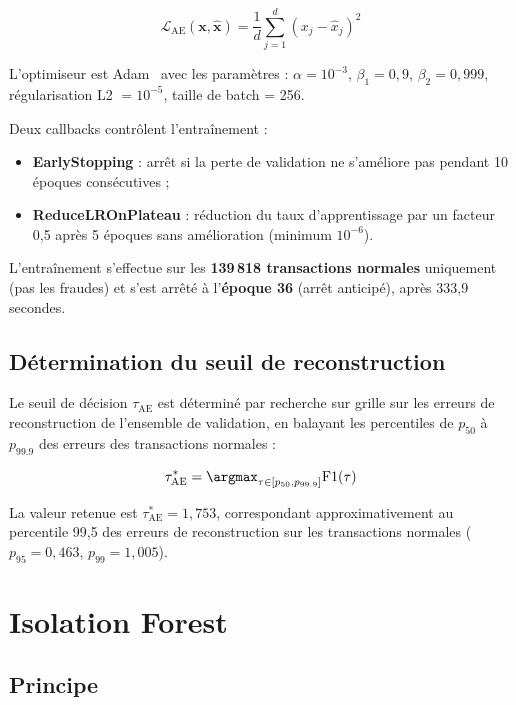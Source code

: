 \documentclass[12pt,a4paper,twoside]{report}
\theoremstyle{definition}
\begin{document}
\begin{equation}
\mathcal{L}_{\text{AE}}(\mathbf{x}, \hat{\mathbf{x}}) =
\frac{1}{d} \sum_{j=1}^{d} (x_j - \hat{x}_j)^2
\label{eq:ae_loss}
\end{equation}

L'optimiseur est Adam~\cite{kingma2014adam} avec les paramètres :
$\alpha = 10^{-3}$, $\beta_1 = 0{,}9$, $\beta_2 = 0{,}999$,
régularisation L2 $= 10^{-5}$, taille de batch = 256.

Deux callbacks contrôlent l'entraînement :
\begin{itemize}
  \item \textbf{EarlyStopping} : arrêt si la perte de validation ne s'améliore
    pas pendant 10 époques consécutives ;
  \item \textbf{ReduceLROnPlateau} : réduction du taux d'apprentissage par un
    facteur 0,5 après 5 époques sans amélioration (minimum $10^{-6}$).
\end{itemize}

L'entraînement s'effectue sur les \textbf{139\,818 transactions normales} uniquement
(pas les fraudes) et s'est arrêté à l'\textbf{époque 36} (arrêt anticipé),
après 333,9 secondes.

\subsection{Détermination du seuil de reconstruction}

Le seuil de décision $\tau_{\text{AE}}$ est déterminé par recherche sur grille
sur les erreurs de reconstruction de l'ensemble de validation, en balayant les
percentiles de $p_{50}$ à $p_{99.9}$ des erreurs des transactions normales :

\begin{equation}
\tau_{\text{AE}}^* = \argmax_{\tau \in [p_{50}, p_{99.9}]} \text{F1}(\tau)
\label{eq:ae_threshold}
\end{equation}

La valeur retenue est $\tau_{\text{AE}}^* = 1{,}753$, correspondant approximativement
au percentile 99,5 des erreurs de reconstruction sur les transactions normales
($p_{95} = 0{,}463$, $p_{99} = 1{,}005$).

\section{Isolation Forest}

\subsection{Principe}
\end{document}
